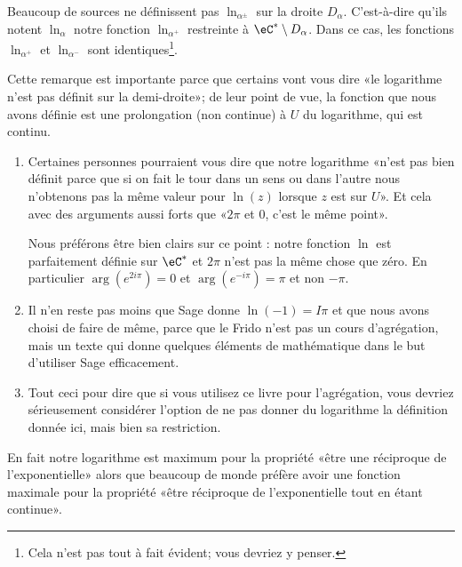 \begin{remark}      \label{REMooFBLLooDnkmjR}
	Beaucoup de sources\cite{ooGUROooApafph} ne définissent pas \( \ln_{\alpha^{\pm}}\) sur la droite \( D_{\alpha}\). C'est-à-dire qu'ils notent \( \ln_{\alpha}\) notre fonction \( \ln_{\alpha^+}\) restreinte à \( \eC^*\setminus D_{\alpha}\). Dans ce cas, les fonctions \( \ln_{\alpha^+}\) et \( \ln_{\alpha^-}\) sont identiques\footnote{Cela n'est pas tout à fait évident; vous devriez y penser.}.

	Cette remarque est importante parce que certains vont vous dire «le logarithme n'est pas définit sur la demi-droite»; de leur point de vue, la fonction que nous avons définie est une prolongation (non continue) à \( U\) du logarithme, qui est continu.

	\begin{enumerate}
		\item
		      Certaines personnes pourraient vous dire que notre logarithme «n'est pas bien définit parce que si on fait le tour dans un sens ou dans l'autre nous n'obtenons pas la même valeur pour \( \ln(z)\) lorsque \( z\) est sur \( U\)». Et cela avec des arguments aussi forts que «\( 2\pi\) et \( 0\), c'est le même point».

		      Nous préférons être bien clairs sur ce point : notre fonction \( \ln\) est parfaitement définie sur \( \eC^*\) et \( 2\pi\) n'est pas la même chose que zéro. En particulier \( \arg( e^{2i\pi})=0\) et \(  \arg(e^{-i\pi})=\pi\) et non \( -\pi\).
		\item
		      Il n'en reste pas moins que Sage donne \( \ln(-1)=I\pi\) et que nous avons choisi de faire de même, parce que le Frido n'est pas un cours d'agrégation, mais un texte qui donne quelques éléments de mathématique dans le but d'utiliser Sage efficacement.
		\item
		      Tout ceci pour dire que si vous utilisez ce livre pour l'agrégation, vous devriez sérieusement considérer l'option de ne pas donner du logarithme la définition donnée ici, mais bien sa restriction.
	\end{enumerate}

	En fait notre logarithme est maximum pour la propriété «être une réciproque de l'exponentielle» alors que beaucoup de monde préfère avoir une fonction maximale pour la propriété «être réciproque de l'exponentielle tout en étant continue».

\end{remark}

